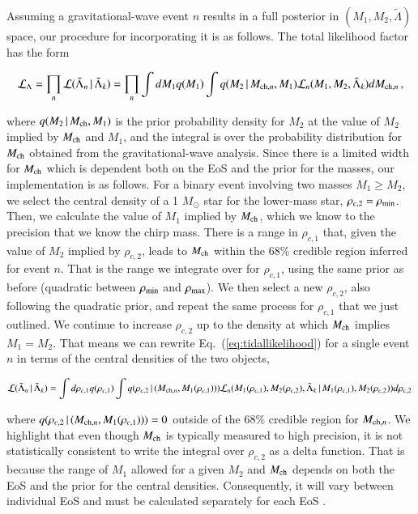 \documentclass[aps,prd,nofootinbib,tightenlines,notitlepage,floatfix,superscriptaddress,showkeys,twocolumn]{revtex4-1}
\begin{document}
Assuming a gravitational-wave event $n$ results in a full posterior in $(M_1,M_2,\tilde{\Lambda})$ space, our procedure for incorporating it is as follows. The total likelihood factor has the form 
\begin{widetext}
\begin{equation}\label{eq:tidallikelihood}
   \mathcal{L}_\Lambda = \prod_n \mathcal{L}(\tilde{\Lambda}_n \, | \,\tilde{\Lambda}_k) = \prod_n \int dM_1 q(M_1)\int q(M_2\, | \,M_{{\rm ch},n},M_1)\mathcal{L}_n(M_1,M_2, \tilde{\Lambda}_k)dM_{{\rm ch},n}\, ,
\end{equation}
\end{widetext}
where $q(M_2\, | \,M_{\rm ch},M_1)$ is the prior probability density for $M_2$ at the value of $M_2$ implied by $M_{\rm ch}$ and $M_1$, and the integral is over the probability distribution for $M_{\rm ch}$ obtained from the gravitational-wave analysis. Since there is a limited width for $M_{\rm ch}$ which is dependent both on the EoS and the prior for the masses, our implementation is as follows. For a binary event involving two masses $M_1 \geq M_2$, we select the central density of a 1 $M_\odot$ star for the lower-mass star, $\rho_{c,2} = \rho_{\rm min}$. Then, we calculate the value of $M_1$ implied by $M_{\rm ch}$, which we know to the precision that we know the chirp mass. There is a range in $\rho_{c,1}$ that, given the value of $M_2$ implied by $\rho_{c,2}$, leads to $M_{\rm ch}$ within the 68\% credible region inferred for event $n$. That is the range we integrate over for $\rho_{c,1}$, using the same prior as before (quadratic between $\rho_{\rm min}$ and $\rho_{\rm max}$). We then select a new $\rho_{c,2}$, also following the quadratic prior, and repeat the same process for $\rho_{c,1}$ that we just outlined. We continue to increase $\rho_{c,2}$ up to the density at which $M_{\rm ch}$ implies $M_1 = M_2$. That means we can rewrite Eq.~(\ref{eq:tidallikelihood}) for a single event $n$ in terms of the central densities of the two objects,
\begin{widetext}
\begin{equation}
   \mathcal{L}(\tilde{\Lambda}_n \, | \,\tilde{\Lambda}_k) = \int d\rho_{c,1} q(\rho_{c,1})\int q(\rho_{c,2}\, | \,(M_{{\rm ch},n},M_1(\rho_{c,1})))\mathcal{L}_n(M_1(\rho_{c,1}),M_2(\rho_{c,2}), \tilde{\Lambda}_k \, | \, M_1(\rho_{c,1}), M_2(\rho_{c,2}))d\rho_{c,2}\,
\end{equation}
\end{widetext}
where $q(\rho_{c,2}\, | \,(M_{{\rm ch},n},M_1(\rho_{c,1}))) = 0$ outside of the 68\% credible region for $M_{{\rm ch},n}$. We highlight that even though $M_{\rm ch}$ is typically measured to high precision, it is not statistically consistent to write the integral over $\rho_{c,2}$ as a delta function. That is because the range of $M_1$ allowed for a given $M_2$ and $M_{\rm ch}$ depends on both the EoS and the prior for the central densities. Consequently, it will vary between individual EoS and must be calculated separately for each EoS \cite{Miller:2019nzo}.
\end{document}
